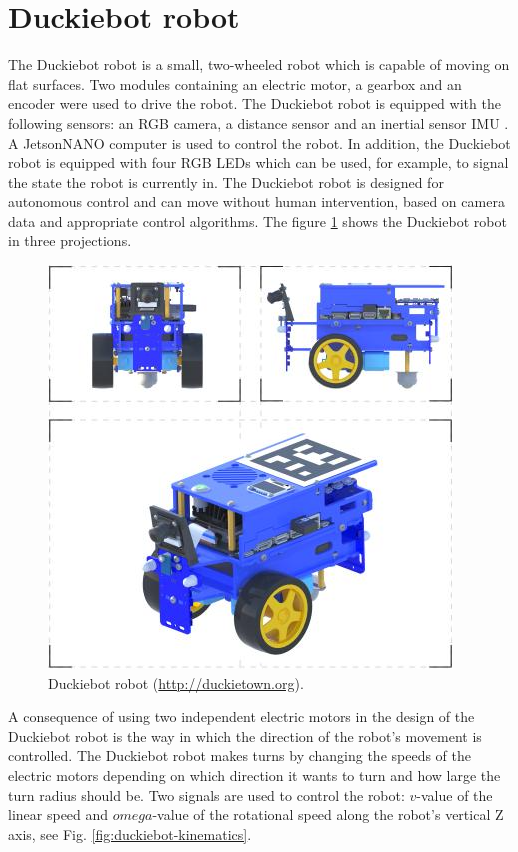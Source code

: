 \documentclass[conference]{IEEEtran}
\begin{document}
\section{Duckiebot robot}\label{sec:robot-duckiebot}
The Duckiebot robot is a small, two-wheeled robot which is capable of moving on flat surfaces. Two modules containing an electric motor, a gearbox and an encoder were used to drive the robot. The Duckiebot robot is equipped with the following sensors: an RGB camera, a distance sensor and an inertial sensor IMU \cite{gupta2022low}. A JetsonNANO computer is used to control the robot. In addition, the Duckiebot robot is equipped with four RGB LEDs which can be used, for example, to signal the state the robot is currently in. The Duckiebot robot is designed for autonomous control and can move without human intervention, based on camera data and appropriate control algorithms. The figure \ref{fig:duckiebot-3d} shows the Duckiebot robot in three projections.

\begin{figure}[h]
    \centering
    \includegraphics[width=.9\columnwidth]{duckiebot-blue-3d}
    \caption{Duckiebot robot (\url{http://duckietown.org}).}
    \label{fig:duckiebot-3d}
\end{figure}

A consequence of using two independent electric motors in the design of the Duckiebot robot is the way in which the direction of the robot's movement is controlled.
The Duckiebot robot makes turns by changing the speeds of the electric motors depending on which direction it wants to turn and how large the turn radius should be.
Two signals are used to control the robot: $v$-value of the linear speed and $omega$-value of the rotational speed along the robot's vertical Z axis, see Fig. \ref{fig:duckiebot-kinematics}.
\end{document}
